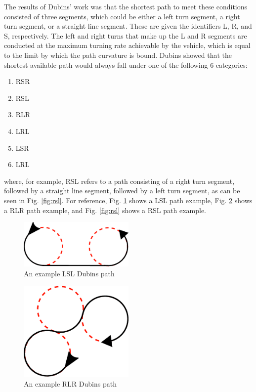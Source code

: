 The results of Dubins' work was that the shortest path to meet these conditions consisted of three segments, which could be either a left turn segment, a right turn segment, or a straight line segment. These are given the identifiers L, R, and S, respectively. The left and right turns that make up the L and R segments are conducted at the maximum turning rate achievable by the vehicle, which is equal to the limit by which the path curvature is bound. Dubins showed that the shortest available path would always fall under one of the following 6 categories:
\begin{enumerate}
	\item RSR
	\item RSL
	\item RLR
	\item LRL
	\item LSR
	\item LRL
\end{enumerate}

where, for example, RSL refers to a path consisting of a right turn segment, followed by a straight line segment, followed by a left turn segment, as can be seen in Fig. \ref{fig:rsl}. For reference, Fig. \ref{fig:lsl} shows a LSL path example, Fig. \ref{fig:rlr} shows a RLR path example, and Fig. \ref{fig:rsl} shows a RSL path example. 

\begin{figure}[htbp!] 
\centering    
\includegraphics[width=0.5\textwidth]{LSL}
\caption[Dubins LSL Path]{An example LSL Dubins path}
\label{fig:lsl}
\end{figure}

\begin{figure}[htbp!] 
\centering    
\includegraphics[width=0.5\textwidth]{RLR}
\caption[Dubins RLR Path]{An example RLR Dubins path}
\label{fig:rlr}
\end{figure}


